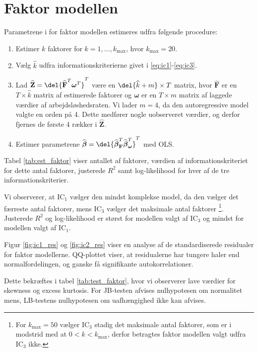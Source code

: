 \section{Faktor modellen}
Parametrene i for faktor modellen estimeres udfra følgende procedure:
\begin{enumerate}
\item Estimer $k$ faktorer for $k = 1, \dots, k_{\max}$, hvor $k_{\max} = 20$.  
\item Vælg $\widehat{k}$ udfra informationskriterierne givet i \eqref{eq:ic1}-\eqref{eq:ic3}.
\item Lad \(\widehat{\textbf{Z}} = \del{\widehat{{\textbf{F}}}^T\boldsymbol{\omega}^T}^T\) være en \(\del{\widehat{k}+m} \times T\) matrix, hvor \(\widehat{{\textbf{F}}}\) er en \(T \times \widehat{k}\) matrix af estimerede faktorer og \(\boldsymbol{\omega}\) er en \(T \times m\) matrix af laggede værdier af arbejdsløshedsraten.
Vi lader \(m = 4\), da den autoregressive model valgte en orden på 4.
Dette medfører nogle uobserveret værdier, og derfor fjernes de første 4 rækker i \(\widehat{\textbf{Z}}\).
\item Estimer parametrene $\widehat{\boldsymbol{\beta}} = \del{ \widehat{\boldsymbol{\beta}}^T_{\textbf{F}} \widehat{\boldsymbol{\beta}}^T_{\boldsymbol{\omega}}}^T$ med OLS.
\end{enumerate}

Tabel \ref{tab:est_faktor} viser antallet af faktorer, værdien af informationskriteriet for dette antal faktorer, justerede \(R^2\) samt log-likelihood for hver af de tre informationskriterier. 


Vi observerer, at IC$_1$ vælger den mindst komplekse model, da den vælger det færreste antal faktorer, mens IC$_3$ vælger det maksimale antal faktorer \footnote{For \(k_\text{max} = 50\) vælger IC\(_3\) stadig det maksimale antal faktorer, som er i modstrid med at \(0<k<k_\text{max}\), derfor betragtes faktor modellen valgt udfra IC\(_3\) ikke.}. 
Justerede \(R^2\) og log-likelihood er størst for modellen valgt af IC$_3$ og mindst for modellen valgt af IC$_1$.

Figur \ref{fig:ic1_res} og \ref{fig:ic2_res} viser en analyse af de standardiserede residualer for faktor modellerne.
QQ-plottet viser, at residualerne har tungere haler end normalfordelingen, og ganske få signifikante autokorrelationer.


Dette bekræftes i tabel \ref{tab:test_faktor}, hvor vi observerer lave værdier for skewness og excess kurtosis. 
For JB-testen afvises nulhypotesen om normalitet mens, LB-testens nulhypotesen om uafhængighed ikke kan afvises. 

